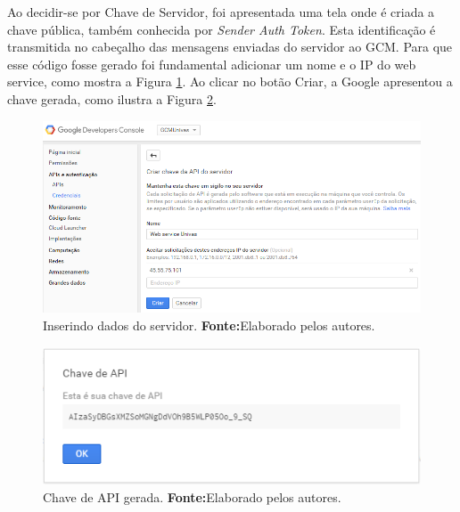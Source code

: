 	\pagebreak
	
	\par Ao decidir-se por Chave de Servidor, foi apresentada uma tela onde é
criada a chave pública, também conhecida por \textit{Sender Auth Token}. Esta
identificação é transmitida no cabeçalho das mensagens enviadas do servidor ao
GCM. Para que esse código fosse gerado foi fundamental adicionar um nome e o IP
do web service, como mostra a Figura \ref{fig:gcm8}. Ao clicar no botão Criar, a
Google apresentou a chave gerada, como ilustra a Figura \ref{fig:gcm9}.
	
	\begin{figure}[h!] 
		\centerline{\includegraphics[scale=0.6]{./imagens/2_q_metodologico/4_procedimentos_resultados/41_gcm/gcm8.png}}
		\caption[Inserindo dados do servidor]{Inserindo dados do servidor.
		\textbf{Fonte:}Elaborado pelos autores.}
		\label{fig:gcm8}
	\end{figure}
	
	\pagebreak
	
	\begin{figure}[h!] 
		\centerline{\includegraphics[scale=1]{./imagens/2_q_metodologico/4_procedimentos_resultados/41_gcm/gcm9.png}}
		\caption[Chave de API gerada]{Chave de API gerada.
		\textbf{Fonte:}Elaborado pelos autores.}
		\label{fig:gcm9}
	\end{figure}
	
	\pagebreak
	
